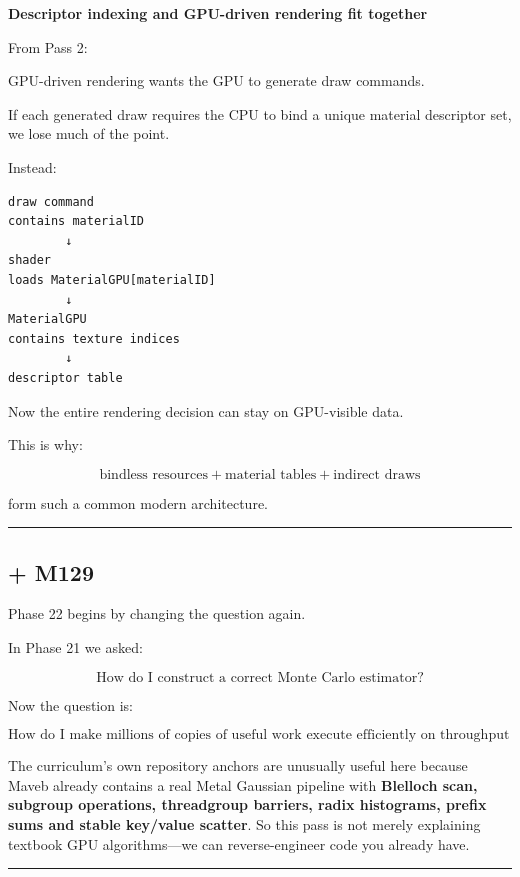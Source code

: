 \textbf{Descriptor indexing and GPU-driven rendering fit together}

From Pass 2:

GPU-driven rendering wants the GPU to generate draw commands.

If each generated draw requires the CPU to bind a unique material descriptor set, we lose much of the point.

Instead:

\begin{verbatim}
draw command
contains materialID
        ↓
shader
loads MaterialGPU[materialID]
        ↓
MaterialGPU
contains texture indices
        ↓
descriptor table
\end{verbatim}

Now the entire rendering decision can stay on GPU-visible data.

This is why:

\[
\boxed{
\text{bindless resources}
+
\text{material tables}
+
\text{indirect draws}
}
\]

form such a common modern architecture.

\begin{center}\rule{0.5\linewidth}{0.5pt}\end{center}

\subsection{+ M129}\label{03-visual-computing-i-ch015-m129}

\hypertarget{03-visual-computing-i-ch015-m129}{}

Phase 22 begins by changing the question again.

In Phase 21 we asked:

\[
\boxed{\text{How do I construct a correct Monte Carlo estimator?}}
\]

Now the question is:

\[
\boxed{\text{How do I make millions of copies of useful work execute efficiently on throughput hardware?}}
\]

The curriculum's own repository anchors are unusually useful here because Maveb already contains a real Metal Gaussian pipeline with \textbf{Blelloch scan, subgroup operations, threadgroup barriers, radix histograms, prefix sums and stable key/value scatter}. So this pass is not merely explaining textbook GPU algorithms---we can reverse-engineer code you already have.

\begin{center}\rule{0.5\linewidth}{0.5pt}\end{center}

